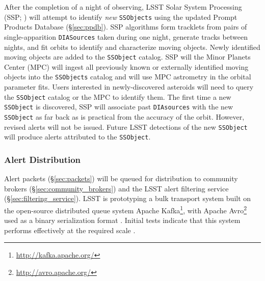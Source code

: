 After the completion of a night of observing,
LSST Solar System Processing (SSP; ) will attempt to identify \textit{new} \texttt{SSObjects} using the updated Prompt Products Database (\S \ref{sec:ppdb}).
SSP algorithms form tracklets from pairs of single-apparition \texttt{DIASources} taken during one night, generate tracks between nights, and fit orbits to identify and characterize moving objects.
Newly identified moving objects are added to the {\tt SSObject} catalog.
SSP will  the Minor Planets Center (MPC) will ingest all previously known or externally identified moving objects into the {\tt SSObjects} catalog\oldtext{,}\newtext{;} and will use MPC astrometry in the orbital parameter fits.
Users interested in newly-discovered asteroids will need to query the \texttt{SSObject} catalog or the MPC to identify them.
The first time a new \texttt{SSObject} is discovered, SSP will associate past \texttt{DIAsources} with the new \texttt{SSObject} as far back as is practical from the accuracy of the orbit.
However, revised alerts will not be issued.
Future LSST detections of the new \texttt{SSObject} will produce alerts attributed to the \texttt{SSObject}.


\subsubsection{Alert Distribution} \label{sec:alert_distribution}

Alert packets (\S \ref{sec:packets}) will be queued for distribution to community brokers (\S \ref{sec:community_brokers}) and the LSST alert filtering service (\S \ref{sec:filtering_service}).
LSST is prototyping  a bulk transport system built on the open-source distributed queue system Apache Kafka\footnote{\url{http://kafka.apache.org/}}, with Apache Avro\footnote{\url{http://avro.apache.org/}} used as a binary serialization format .
Initial tests indicate that this system performs effectively at the required scale .


